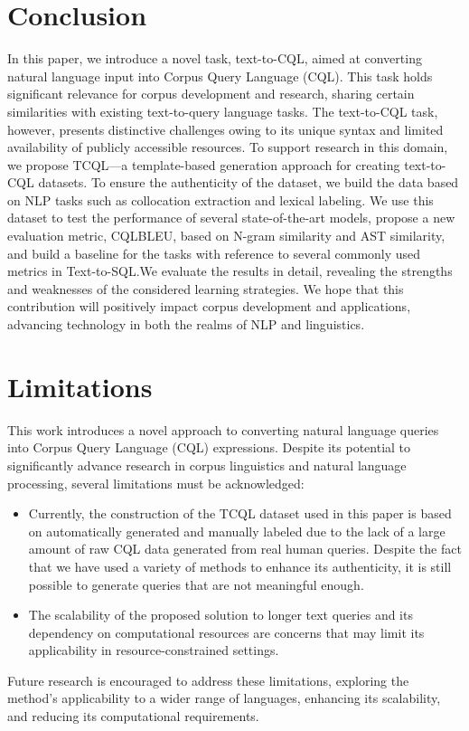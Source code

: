 \documentclass[11pt]{article}
\begin{document}
\begin{CJK*}{UTF8}{gbsn}
\section{Conclusion}

In this paper, we introduce a novel task, text-to-CQL, aimed at converting natural language input into Corpus Query Language (CQL). This task holds significant relevance for corpus development and research, sharing certain similarities with existing text-to-query language tasks. The text-to-CQL task, however, presents distinctive challenges owing to its unique syntax and limited availability of publicly accessible resources. To support research in this domain, we propose TCQL—a template-based generation approach for creating text-to-CQL datasets. To ensure the authenticity of the dataset, we build the data based on NLP tasks such as collocation extraction and lexical labeling. We use this dataset to test the performance of several state-of-the-art models, propose a new evaluation metric, CQLBLEU, based on N-gram similarity and AST similarity, and build a baseline for the tasks with reference to several commonly used metrics in Text-to-SQL.We evaluate the results in detail, revealing the strengths and weaknesses of the considered learning strategies. We hope that this contribution will positively impact corpus development and applications, advancing technology in both the realms of NLP and linguistics.



\label{sec:bibtex}

\section*{Limitations}
This work introduces a novel approach to converting natural language queries into Corpus Query Language (CQL) expressions. Despite its potential to significantly advance research in corpus linguistics and natural language processing, several limitations must be acknowledged:

\begin{itemize}
    \item Currently, the construction of the TCQL dataset used in this paper is based on automatically generated and manually labeled due to the lack of a large amount of raw CQL data generated from real human queries. Despite the fact that we have used a variety of methods to enhance its authenticity, it is still possible to generate queries that are not meaningful enough.
    \item The scalability of the proposed solution to longer text queries and its dependency on computational resources are concerns that may limit its applicability in resource-constrained settings.
\end{itemize}

Future research is encouraged to address these limitations, exploring the method's applicability to a wider range of languages, enhancing its scalability, and reducing its computational requirements.






\end{CJK*}
\end{document}
